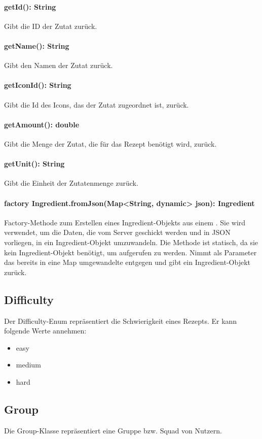 \documentclass[parskip=full]{scrartcl}
\begin{document}
\paragraph{getId(): String}
Gibt die ID der Zutat zurück.
\paragraph{getName(): String}
Gibt den Namen der Zutat zurück.
\paragraph{getIconId(): String}
Gibt die Id des Icons, das der Zutat zugeordnet ist, zurück.
\paragraph{getAmount(): double}
Gibt die Menge der Zutat, die für das Rezept benötigt wird, zurück.
\paragraph{getUnit(): String}
Gibt die Einheit der Zutatenmenge zurück.
\paragraph{factory Ingredient.fromJson(Map<String, dynamic> json): Ingredient}
Factory-Methode zum Erstellen eines Ingredient-Objekts aus einem . Sie wird verwendet, um die Daten, die vom Server geschickt werden und in \Gls{JSON} vorliegen, in ein Ingredient-Objekt umzuwandeln. Die Methode ist statisch, da sie kein Ingredient-Objekt benötigt, um aufgerufen zu werden. Nimmt als Parameter das bereits in eine Map umgewandelte  entgegen und gibt ein Ingredient-Objekt zurück.

\newpage
\subsection{Difficulty}
Der Difficulty-Enum repräsentiert die Schwierigkeit eines Rezepts. Er kann folgende Werte annehmen:
\begin{itemize}
    \item easy
    \item medium
    \item hard
\end{itemize}
\newpage

\subsection{Group}
Die Group-Klasse repräsentiert eine Gruppe bzw. Squad von Nutzern.
\end{document}
